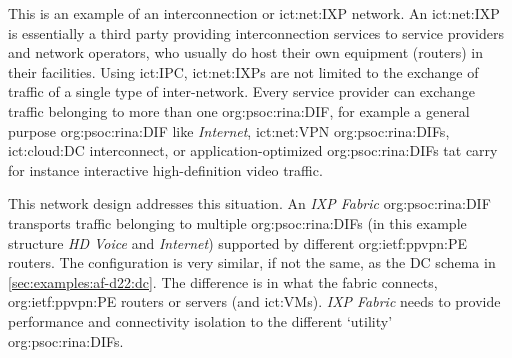 This is an example of an interconnection or \ac{ict:net:IXP} network.
An \ac{ict:net:IXP} is essentially a third party providing interconnection services to service providers and network operators, who usually do host their own equipment (routers) in their facilities.
Using \ac{ict:IPC}, \acp{ict:net:IXP} are not limited to the exchange of traffic of a single type of inter-network.
Every service provider can exchange traffic belonging to more than one \ac{org:psoc:rina:DIF}, for example
    a general purpose \ac{org:psoc:rina:DIF} like \textit{Internet},
    \acs{ict:net:VPN} \acp{org:psoc:rina:DIF},
    \acs{ict:cloud:DC} interconnect, or
    application-optimized \acp{org:psoc:rina:DIF} tat carry for instance interactive high-definition video traffic.

This network design addresses this situation.
An \textit{IXP Fabric} \ac{org:psoc:rina:DIF} transports traffic belonging to multiple \acp{org:psoc:rina:DIF} (in this example structure \textit{HD Voice} and \textit{Internet}) supported by different \ac{org:ietf:ppvpn:PE} routers.
The configuration is very similar, if not the same, as the DC schema in \autoref{sec:examples:af-d22:dc}.
The difference is in what the fabric connects, \ac{org:ietf:ppvpn:PE} routers or servers (and \acp{ict:VM}).
\textit{IXP Fabric} needs to provide performance and connectivity isolation to the different `utility' \acp{org:psoc:rina:DIF}.
